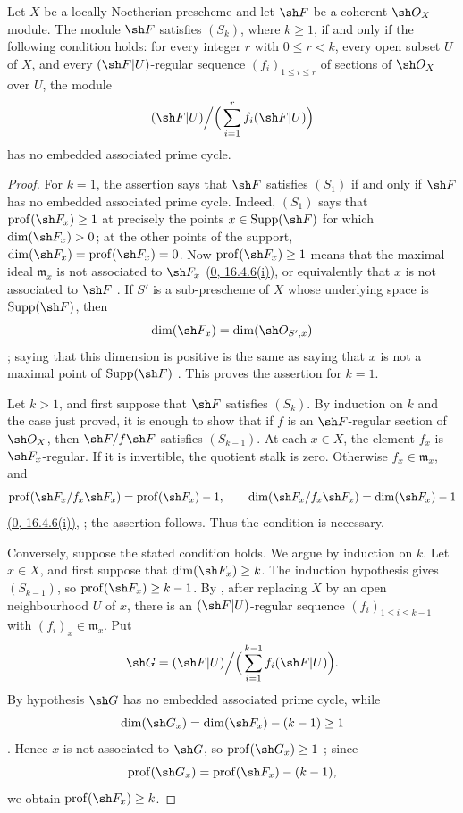 \begin{proposition}[5.7.5]
\label{IV.5.7.5}
Let $X$ be a locally Noetherian prescheme and let $\sh F$ be a
coherent $\sh O_X$-module.  The module $\sh F$ satisfies $(S_k)$,
where $k\geq1$, if and only if the following condition holds:
for every integer $r$ with $0\leq r<k$, every open subset $U$ of
$X$, and every $(\sh F|U)$-regular sequence
$(f_i)_{1\leq i\leq r}$ of sections of $\sh O_X$ over $U$, the
module
\[
(\sh F|U)\Big/\Big(\sum_{i=1}^{r}f_i(\sh F|U)\Big)
\]
has no embedded associated prime cycle.
\end{proposition}

\begin{proof}
For $k=1$, the assertion says that $\sh F$ satisfies $(S_1)$ if and
only if $\sh F$ has no embedded associated prime cycle.  Indeed,
$(S_1)$ says that
$\operatorname{prof}(\sh F_x)\geq1$ at precisely the points
$x\in\operatorname{Supp}(\sh F)$ for which
$\dim(\sh F_x)>0$; at the other points of the support,
$\dim(\sh F_x)=\operatorname{prof}(\sh F_x)=0$.
Now $\operatorname{prof}(\sh F_x)\geq1$ means that the maximal ideal
$\mathfrak m_x$ is not associated to $\sh F_x$
\hyperref[0.16.4.6.i]{\textup{(0, 16.4.6(i))}}, or equivalently that $x$ is not associated to
$\sh F$ .  If $S'$ is a sub-prescheme of $X$ whose
underlying space is $\operatorname{Supp}(\sh F)$, then
\[
\dim(\sh F_x)=\dim(\sh O_{S',x})
\]
; saying that this dimension is positive is the
same as saying that $x$ is not a maximal point of
$\operatorname{Supp}(\sh F)$ .  This proves the
assertion for $k=1$.

Let $k>1$, and first suppose that $\sh F$ satisfies $(S_k)$.  By
induction on $k$ and the case just proved, it is enough to show that
if $f$ is an $\sh F$-regular section of $\sh O_X$, then
$\sh F/f\sh F$ satisfies $(S_{k-1})$.  At each $x\in X$, the element
$f_x$ is $\sh F_x$-regular.  If it is invertible, the quotient stalk
is zero.  Otherwise $f_x\in\mathfrak m_x$, and
\[
\operatorname{prof}(\sh F_x/f_x\sh F_x)
 =\operatorname{prof}(\sh F_x)-1,\qquad
\dim(\sh F_x/f_x\sh F_x)=\dim(\sh F_x)-1
\]
\hyperref[0.16.4.6.i]{\textup{(0, 16.4.6(i))}}, ; the assertion follows.
Thus the condition is necessary.

Conversely, suppose the stated condition holds.  We argue by
induction on $k$.  Let $x\in X$, and first suppose that
$\dim(\sh F_x)\geq k$.  The induction hypothesis gives $(S_{k-1})$,
so $\operatorname{prof}(\sh F_x)\geq k-1$.  By
, after replacing $X$ by an open neighbourhood
$U$ of $x$, there is an $(\sh F|U)$-regular sequence
$(f_i)_{1\leq i\leq k-1}$ with
$(f_i)_x\in\mathfrak m_x$.  Put
\[
\sh G=(\sh F|U)\Big/\Big(
 \sum_{i=1}^{k-1}f_i(\sh F|U)\Big).
\]
By hypothesis $\sh G$ has no embedded associated prime cycle, while
\[
\dim(\sh G_x)=\dim(\sh F_x)-(k-1)\geq1
\]
.  Hence $x$ is not associated to $\sh G$, so
$\operatorname{prof}(\sh G_x)\geq1$ ; since
\[
\operatorname{prof}(\sh G_x)
 =\operatorname{prof}(\sh F_x)-(k-1),
\]
we obtain $\operatorname{prof}(\sh F_x)\geq k$.


\end{proof}
